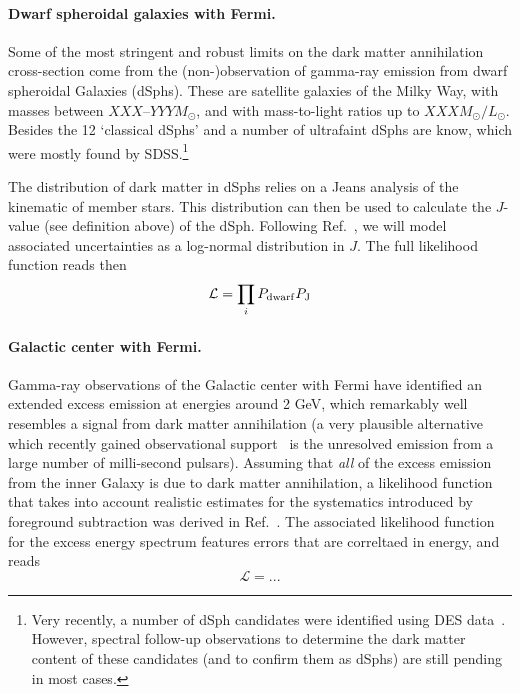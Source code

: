 \paragraph{Dwarf spheroidal galaxies with Fermi.}
Some of the most stringent and robust limits on the dark matter annihilation
cross-section come from the (non-)observation of gamma-ray emission from dwarf
spheroidal Galaxies (dSphs).  These are satellite galaxies of the Milky Way,
with masses between $XXX$--$YYY M_\odot$, and with mass-to-light ratios up to
$XXX M_\odot/L_\odot$.  Besides the 12 `classical dSphs' and a number of
ultrafaint dSphs are know, which were mostly found by SDSS.\footnote{Very
recently, a number of dSph candidates were identified using DES
data~\cite{123}.  However, spectral follow-up observations to
determine the dark matter content of these candidates (and to
confirm them as dSphs) are still pending in most cases.}  

The distribution of dark matter in dSphs relies on a Jeans analysis of the
kinematic of member stars.  This distribution can then be used to calculate the
$J$-value (see definition above) of the dSph.  Following
Ref.~\cite{FermiDwarfs}, we will model associated uncertainties as a log-normal
distribution in $J$.  The full likelihood function reads then
%
\begin{equation}
  \mathcal{L} = \prod_i P_{\rm dwarf} P_{\rm J}
\end{equation}
%

\paragraph{Galactic center with Fermi.}
Gamma-ray observations of the Galactic center with Fermi have identified an
extended excess emission at energies around 2 GeV, which remarkably well
resembles a signal from dark matter annihilation (a very plausible alternative
which recently gained observational support~\cite{123} is the
unresolved emission from a large number of milli-second pulsars).  Assuming
that \emph{all} of the excess emission from the inner Galaxy is due to dark
matter annihilation, a likelihood function that takes into account realistic
estimates for the systematics introduced by foreground subtraction was derived
in Ref.~\cite{123}.  The associated likelihood function for the excess energy
spectrum features errors that are correltaed in energy, and reads
\begin{equation}
  \mathcal{L} = ...
\end{equation}

